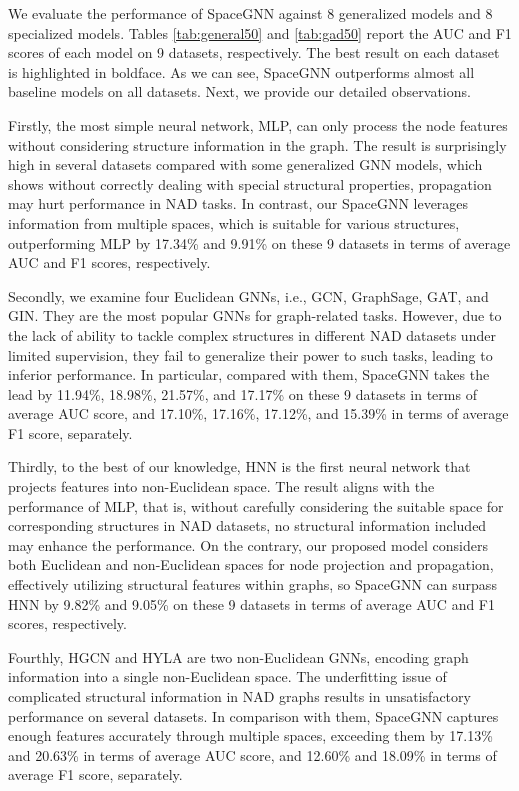 We evaluate the performance of SpaceGNN against 8 generalized models and 8 specialized models. Tables \ref{tab:general50} and \ref{tab:gad50} report the AUC and F1 scores of each model on 9 datasets, respectively. The best result on each dataset is highlighted in boldface. As we can see, SpaceGNN outperforms almost all baseline models on all datasets. Next, we provide our detailed observations. 



Firstly, the most simple neural network, MLP, can only process the node features without considering structure information in the graph. The result is surprisingly high in several datasets compared with some generalized GNN models, which shows without correctly dealing with special structural properties, propagation may hurt performance in NAD tasks. In contrast, our SpaceGNN leverages information from multiple spaces, which is suitable for various structures, outperforming MLP by 17.34\% and 9.91\% on these 9 datasets in terms of average AUC and F1 scores, respectively. 

Secondly, we examine four Euclidean GNNs, i.e., GCN, GraphSage, GAT, and GIN. They are the most popular GNNs for graph-related tasks. However, due to the lack of ability to tackle complex structures in different NAD datasets under limited supervision, they fail to generalize their power to such tasks, leading to inferior performance. In particular, compared with them, SpaceGNN takes the lead by 11.94\%, 18.98\%, 21.57\%, and 17.17\% on these 9 datasets in terms of average AUC score, and 17.10\%, 17.16\%, 17.12\%, and 15.39\% in terms of average F1 score, separately. 

Thirdly, to the best of our knowledge, HNN is the first neural network that projects features into non-Euclidean space. The result aligns with the performance of MLP, that is, without carefully considering the suitable space for corresponding structures in NAD datasets, no structural information included may enhance the performance. On the contrary, our proposed model considers both Euclidean and non-Euclidean spaces for node projection and propagation, effectively utilizing structural features within graphs, so SpaceGNN can surpass HNN by 9.82\% and 9.05\% on these 9 datasets in terms of average AUC and F1 scores, respectively. 

Fourthly, HGCN and HYLA are two non-Euclidean GNNs, encoding graph information into a single non-Euclidean space. The underfitting issue of complicated structural information in NAD graphs results in unsatisfactory performance on several datasets. In comparison with them, SpaceGNN captures enough features accurately through multiple spaces, exceeding them by 17.13\% and 20.63\% in terms of average AUC score, and 12.60\% and 18.09\% in terms of average F1 score, separately. 

